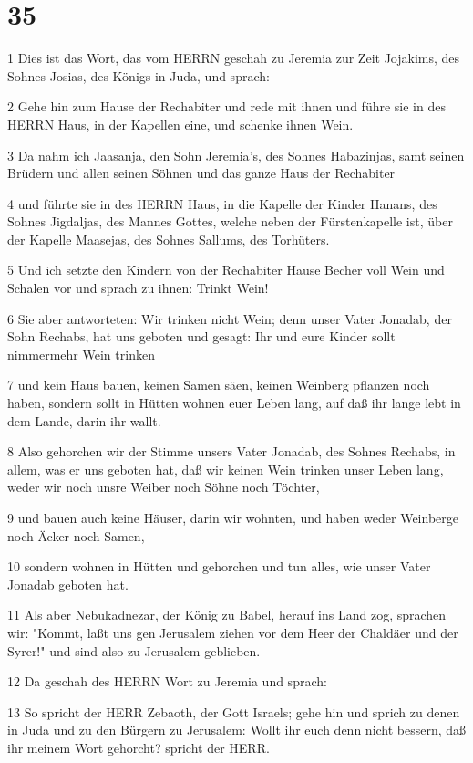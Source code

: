 \chapter{35}

\par 1 Dies ist das Wort, das vom HERRN geschah zu Jeremia zur Zeit Jojakims, des Sohnes Josias, des Königs in Juda, und sprach:
\par 2 Gehe hin zum Hause der Rechabiter und rede mit ihnen und führe sie in des HERRN Haus, in der Kapellen eine, und schenke ihnen Wein.
\par 3 Da nahm ich Jaasanja, den Sohn Jeremia's, des Sohnes Habazinjas, samt seinen Brüdern und allen seinen Söhnen und das ganze Haus der Rechabiter
\par 4 und führte sie in des HERRN Haus, in die Kapelle der Kinder Hanans, des Sohnes Jigdaljas, des Mannes Gottes, welche neben der Fürstenkapelle ist, über der Kapelle Maasejas, des Sohnes Sallums, des Torhüters.
\par 5 Und ich setzte den Kindern von der Rechabiter Hause Becher voll Wein und Schalen vor und sprach zu ihnen: Trinkt Wein!
\par 6 Sie aber antworteten: Wir trinken nicht Wein; denn unser Vater Jonadab, der Sohn Rechabs, hat uns geboten und gesagt: Ihr und eure Kinder sollt nimmermehr Wein trinken
\par 7 und kein Haus bauen, keinen Samen säen, keinen Weinberg pflanzen noch haben, sondern sollt in Hütten wohnen euer Leben lang, auf daß ihr lange lebt in dem Lande, darin ihr wallt.
\par 8 Also gehorchen wir der Stimme unsers Vater Jonadab, des Sohnes Rechabs, in allem, was er uns geboten hat, daß wir keinen Wein trinken unser Leben lang, weder wir noch unsre Weiber noch Söhne noch Töchter,
\par 9 und bauen auch keine Häuser, darin wir wohnten, und haben weder Weinberge noch Äcker noch Samen,
\par 10 sondern wohnen in Hütten und gehorchen und tun alles, wie unser Vater Jonadab geboten hat.
\par 11 Als aber Nebukadnezar, der König zu Babel, herauf ins Land zog, sprachen wir: "Kommt, laßt uns gen Jerusalem ziehen vor dem Heer der Chaldäer und der Syrer!" und sind also zu Jerusalem geblieben.
\par 12 Da geschah des HERRN Wort zu Jeremia und sprach:
\par 13 So spricht der HERR Zebaoth, der Gott Israels; gehe hin und sprich zu denen in Juda und zu den Bürgern zu Jerusalem: Wollt ihr euch denn nicht bessern, daß ihr meinem Wort gehorcht? spricht der HERR.
